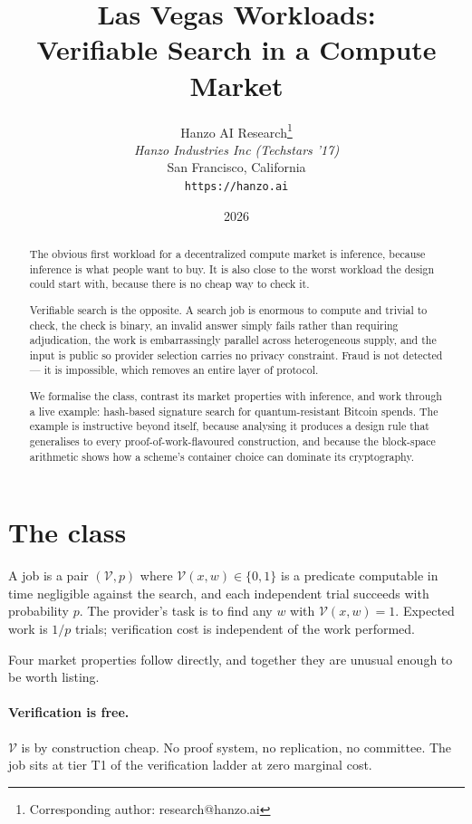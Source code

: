\documentclass[11pt,a4paper]{article}
\title{Las Vegas Workloads:\\Verifiable Search in a Compute Market}
\author{
Hanzo AI Research\thanks{Corresponding author: research@hanzo.ai} \\
\textit{Hanzo Industries Inc (Techstars '17)} \\
San Francisco, California \\
\texttt{https://hanzo.ai}
}
\date{2026}
\begin{document}
\hanzocoverpage

\begin{abstract}
The obvious first workload for a decentralized compute market is inference,
because inference is what people want to buy. It is also close to the worst
workload the design could start with, because there is no cheap way to check it.

Verifiable search is the opposite. A search job is enormous to compute and
trivial to check, the check is binary, an invalid answer simply fails rather
than requiring adjudication, the work is embarrassingly parallel across
heterogeneous supply, and the input is public so provider selection carries no
privacy constraint. Fraud is not detected --- it is impossible, which removes an
entire layer of protocol.

We formalise the class, contrast its market properties with inference, and work
through a live example: hash-based signature search for quantum-resistant
Bitcoin spends. The example is instructive beyond itself, because analysing it
produces a design rule that generalises to every proof-of-work-flavoured
construction, and because the block-space arithmetic shows how a scheme's
container choice can dominate its cryptography.
\end{abstract}

\tableofcontents
\newpage

\section{The class}

\begin{definition}
A job is a pair $(\mathcal{V}, p)$ where $\mathcal{V}(x, w) \in \{0,1\}$ is a
predicate computable in time negligible against the search, and each independent
trial succeeds with probability $p$. The provider's task is to find any $w$ with
$\mathcal{V}(x,w) = 1$. Expected work is $1/p$ trials; verification cost is
independent of the work performed.
\end{definition}

Four market properties follow directly, and together they are unusual enough to
be worth listing.

\paragraph{Verification is free.} $\mathcal{V}$ is by construction cheap. No
proof system, no replication, no committee. The job sits at tier T1 of the
verification ladder at zero marginal cost.
\end{document}
